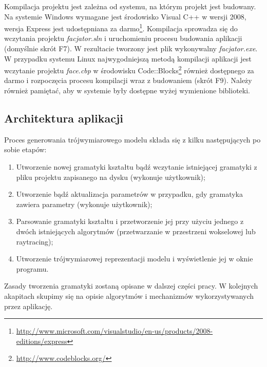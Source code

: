 Kompilacja projektu jest zależna od systemu, na którym projekt jest budowany. Na
systemie Windows wymagane jest środowisko Visual C++ w wersji 2008, wersja
Express jest udostępniana za
darmo\footnote{\url{http://www.microsoft.com/visualstudio/en-us/products/2008-editions/express}}.
Kompilacja sprowadza się do wczytania projektu \emph{facjator.sln} i
uruchomieniu procesu budowania aplikacji (domyślnie skrót F7). W rezultacie
tworzony jest plik wykonywalny \emph{facjator.exe}.
W przypadku systemu Linux najwygodniejszą metodą kompilacji aplikacji jest
wczytanie projektu \emph{face.cbp} w środowisku
Code::Blocks\footnote{\url{http://www.codeblocks.org/}} również dostępnego za
darmo i rozpoczęcia procesu kompilacji wraz z budowaniem (skrót F9). Należy
również pamiętać, aby w systemie były dostępne wyżej wymienione biblioteki.

\subsection{Architektura aplikacji}
Proces generowania trójwymiarowego modelu składa się z kilku następujących po
sobie etapów:
\begin{enumerate}
  \item Utworzenie nowej gramatyki kształtu bądź wczytanie istniejącej gramatyki
  z pliku projektu zapisanego na dysku (wykonuje użytkownik);
  \item Utworzenie bądź aktualizacja parametrów w przypadku, gdy gramatyka
  zawiera parametry (wykonuje użytkownik);
  \item Parsowanie gramatyki kształtu i przetworzenie jej przy użyciu jednego z
  dwóch istniejących algorytmów (przetwarzanie w przestrzeni wokselowej lub
  raytracing);
  \item Utworzenie trójwymiarowej reprezentacji modelu i wyświetlenie jej w
  oknie programu.
\end{enumerate}
Zasady tworzenia gramatyki zostaną opisane w dalszej części pracy. W kolejnych
akapitach skupimy się na opisie algorytmów i mechanizmów wykorzystywanych przez
aplikację.
